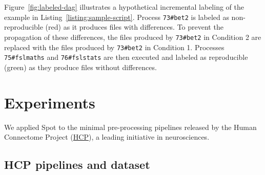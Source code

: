 \documentclass[a4paper,num-refs]{oup-contemporary}
\newcommand{\toolname}[0]{Spot\xspace}
\begin{document}
Figure~\ref{fig:labeled-dag} illustrates a hypothetical incremental
labeling of the example in Listing~\ref{listing:sample-script}. Process
\texttt{73\#bet2} is labeled as non-reproducible (red) as it produces files
with differences. To prevent the propagation of these differences, the
files produced by \texttt{73\#bet2} in Condition 2 are replaced with the
files produced by \texttt{73\#bet2} in Condition 1. Processes
\texttt{75\#fslmaths} and \texttt{76\#fslstats} are then executed and
labeled as reproducible (green) as they produce files without differences.

\section{Experiments}

We applied \toolname to the minimal
pre-processing pipelines released by the Human Connectome Project
(\href{https://www.humanconnectome.org}{HCP}), a leading initiative in
neurosciences. 




\subsection{HCP pipelines and dataset}

\end{document}
